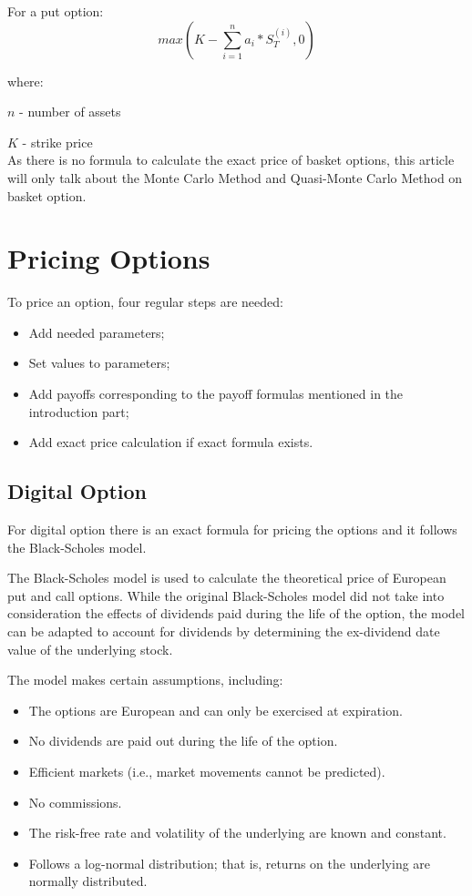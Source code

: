 \documentclass[]{elsarticle}
\theoremstyle{definition}
\theoremstyle{remark}
\begin{document}
For a put option:
 \[max(K - \sum_{i=1}^n {a_i*S_T^{(i)}}, 0)\]
 
 where:
 
 \(n\) - number of assets
 
 \(K\) - strike price\\
 
 
As there is no formula to calculate the exact price of basket options, this article will only talk about the Monte Carlo Method and Quasi-Monte Carlo Method on basket option.

\section{Pricing Options}
To price an option, four regular steps are needed:
\begin{itemize}
\item Add needed parameters;
\item Set values to parameters;
\item Add payoffs corresponding to the payoff formulas mentioned in the introduction part;
\item Add exact price calculation if exact formula exists.
\end{itemize}

\subsection{Digital Option}
For digital option there is an exact formula for pricing the options and it follows the Black-Scholes model.

The Black-Scholes model is used to calculate the theoretical price of European put and call options. While the original Black-Scholes model did not take into consideration the effects of dividends paid during the life of the option, the model can be adapted to account for dividends by determining the ex-dividend date value of the underlying stock.

The model makes certain assumptions, including:
\begin{itemize}
\item The options are European and can only be exercised at expiration.
\item No dividends are paid out during the life of the option.
\item Efficient markets (i.e., market movements cannot be predicted).
\item No commissions.
\item The risk-free rate and volatility of the underlying are known and constant.
\item Follows a log-normal distribution; that is, returns on the underlying are normally distributed.
\end{itemize}
\end{document}
